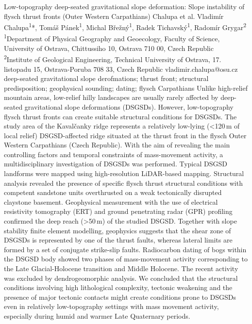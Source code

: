 
\abstract
{Low-topography deep-seated gravitational slope deformation: Slope instability of flysch thrust fronts (Outer Western Carpathians)} 
{Chalupa et al.} 
{Vladimír Chalupa\textsuperscript{1}*, Tomáš Pánek\textsuperscript{1}, Michal Břežný\textsuperscript{1}, Radek Tichavský\textsuperscript{1}, Radomír Grygar\textsuperscript{2}} 
{\TLtag} 
{
\textsuperscript{1}Department of Physical Geography and Geoecology, Faculty of Science, University of Ostrava, Chittussiho 10, Ostrava 710 00, Czech Republic\\
\textsuperscript{2}Institute of Geological Engineering, Technical University of Ostrava, 17. listopadu 15, Ostrava-Poruba 708 33, Czech Republic
}
{vladimir.chalupa@osu.cz}  %
{deep-seated gravitational slope derofmations; thrust front; structural predisposition; geophysical sounding; dating; flysch Carpathians}
{Unlike high-relief mountain areas, low-relief hilly landscapes are usually rarely affected by deep-seated gravitational slope deformations (DSGSDs). However, low-topography flysch thrust fronts can create suitable structural conditions for DSGSDs. The study area of the Kavalčanky ridge represents a relatively low-lying (<120 m of local relief) DSGSD-affected ridge situated at the thrust front in the flysch Outer Western Carpathians (Czech Republic). With the aim of revealing the main controlling factors and temporal constraints of mass-movement activity, a multidisciplinary investigation of DSGSDs was performed. Typical DSGSD landforms were mapped using high-resolution LiDAR-based mapping. Structural analysis revealed the presence of specific flysch thrust structural conditions with competent sandstone units overthrusted on a weak tectonically disrupted claystone basement. Geophysical measurement with the use of electrical resistivity tomography (ERT) and ground penetrating radar (GPR) profiling confirmed the deep reach (>50 m) of the studied DSGSD. Together with slope stability finite element modelling, geophysics suggests that the shear zone of DSGSDs is represented by one of the thrust faults, whereas lateral limits are formed by a set of conjugate strike-slip faults. Radiocarbon dating of bogs within the DSGSD body showed two phases of mass-movement activity corresponding to the Late Glacial-Holocene transition and Middle Holocene. The recent activity was excluded by dendrogeomorphic analysis. We concluded that the structural conditions involving high lithological complexity, tectonic weakening and the presence of major tectonic contacts might create conditions prone to DSGSDs even in relatively low-topography settings with mass movement activity, especially during humid and warmer Late Quaternary periods.
}
